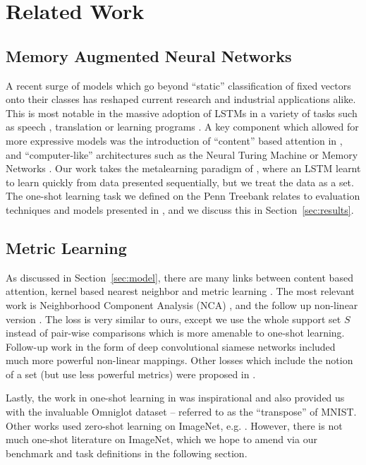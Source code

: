 \section{Related Work}
\label{sec:relwork}

\subsection{Memory Augmented Neural Networks}

A recent surge of models which go beyond ``static'' classification of fixed vectors onto their classes has reshaped current research and industrial applications alike. This is most notable in the massive adoption of LSTMs \cite{hochreiter} in a variety of tasks such as speech \cite{hinton2012deep}, translation \cite{seq2seqilya,montreal} or learning programs \cite{ntm, ptrnets}.
A key component which allowed for more expressive models was the introduction of ``content'' based attention in \cite{montreal}, and ``computer-like'' architectures such as the Neural Turing Machine \cite{ntm} or Memory Networks \cite{memnets}.
Our work takes the metalearning paradigm of \cite{mann}, where an LSTM learnt to learn quickly from data presented sequentially, but we treat the data as a set.
The one-shot learning task we defined on the Penn Treebank \cite{marcus1993building} relates to evaluation techniques and models presented in \cite{hill2015goldilocks}, and we discuss this in Section~\ref{sec:results}.


\subsection{Metric Learning}

As discussed in Section~\ref{sec:model}, there are many links between content based attention, kernel based nearest neighbor and metric learning \cite{lwl}.  The most relevant work is Neighborhood Component Analysis (NCA) \cite{nca}, and the follow up non-linear version \cite{salakhutdinov2007learning}. The loss is very similar to ours, except we use the whole support set $S$ instead of pair-wise comparisons which is more amenable to one-shot learning. Follow-up work in the form of deep convolutional siamese \cite{siamese} networks included much more powerful non-linear mappings. Other losses which include the notion of a set (but use less powerful metrics) were proposed in \cite{weinberger2009distance}.

Lastly, the work in one-shot learning in \cite{omniglot} was inspirational and also provided us with the invaluable Omniglot dataset -- referred to as the ``transpose'' of MNIST. Other works used zero-shot learning on ImageNet, e.g. \cite{norouzi2013zero}. However, there is not much one-shot literature on ImageNet, which we hope to amend via our benchmark and task definitions in the following section.